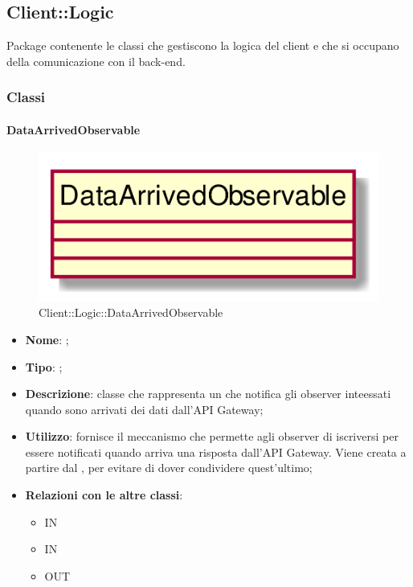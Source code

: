 \subsection{Client::Logic}
Package contenente le classi che gestiscono la logica del client e che si occupano della comunicazione con il back-end.
\subsubsection{Classi}
\hypertarget{DataArrivedObservable_label}{\paragraph{DataArrivedObservable}}
\begin{figure}[h]
	\centering
	\includegraphics[width=\textwidth,height=\textheight,keepaspectratio]{images/ClassDataArrivedObservable.png}
	\caption{Client::Logic::DataArrivedObservable}
\end{figure}
\begin{itemize}
	\item \textbf{Nome}: ;
	\item \textbf{Tipo}: ;
	\item \textbf{Descrizione}: classe che rappresenta un  che notifica gli observer inteessati quando sono arrivati dei dati dall'API Gateway;
	\item \textbf{Utilizzo}: fornisce il meccanismo che permette agli observer di iscriversi per essere notificati quando arriva una risposta dall'API Gateway. Viene creata a partire dal , per evitare di dover condividere quest'ultimo;
	\item \textbf{Relazioni con le altre classi}:
	\begin{itemize}
		\item IN \hyperlink{ApplicationManagerObserver_label}{}
		\item IN \hyperlink{PlayerObserver_label}{}
		\item OUT \hyperlink{DataArrivedSubject_label}{}
	\end{itemize}
\end{itemize}
\FloatBarrier


